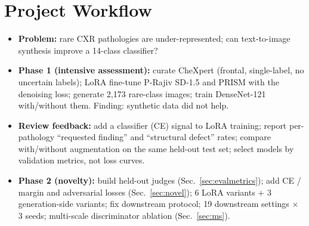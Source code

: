 \documentclass[twoside,english]{article}
\begin{document}
\section{Project Workflow}\label{sec:workflow}
\begin{itemize}\setlength\itemsep{0pt}
\item \textbf{Problem:} rare CXR pathologies are under-represented; can text-to-image synthesis improve a 14-class classifier?
\item \textbf{Phase 1 (intensive assessment):} curate CheXpert (frontal, single-label, no uncertain labels); LoRA fine-tune P-Rajiv SD-1.5 and PRISM with the denoising loss; generate 2{,}173 rare-class images; train DenseNet-121 with/without them. Finding: synthetic data did not help.
\item \textbf{Review feedback:} add a classifier (CE) signal to LoRA training; report per-pathology ``requested finding'' and ``structural defect'' rates; compare with/without augmentation on the same held-out test set; select models by validation metrics, not loss curves.
\item \textbf{Phase 2 (novelty):} build held-out judges (Sec.~\ref{sec:evalmetrics}); add CE / margin and adversarial losses (Sec.~\ref{sec:novel}); 6 LoRA variants + 3 generation-side variants; fix downstream protocol; 19 downstream settings $\times$ 3 seeds; multi-scale discriminator ablation (Sec.~\ref{sec:ms}).
\end{itemize}
\end{document}
